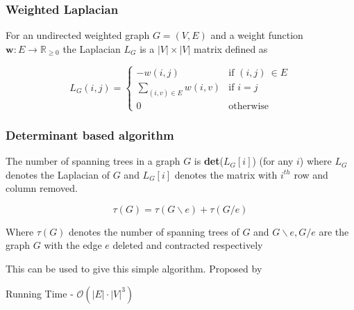 \documentclass{beamer}
\begin{document}
\begin{frame}
 \frametitle{Weighted Laplacian}
 
 For an undirected weighted graph $G = (V, E)$ and a weight function $\textbf{w}: E \rightarrow \mathbb{R}_{\geq 0}$ the Laplacian $L_G$ is a $|V| \times |V|$ matrix defined as 
 
  \[
    L_G(i, j) = 
\begin{cases}
    -w(i,j)& \text{if } (i, j) \ \in E\\
    \displaystyle\sum_{(i,v) \in E} w(i, v)& \text{if } i = j\\
    0              & \text{otherwise}
\end{cases}
\]

\end{frame}


\begin{frame}
 \frametitle{Determinant based algorithm}
 
\begin{theorem}
 
  The number of spanning trees in a graph $G$ is \textbf{det}($L_G[i]$) (for any $i$) where $L_G$ denotes the Laplacian of $G$ and $L_G[i]$ denotes the matrix with $i^{th}$ row and column removed. 
 
\end{theorem}

 
 \pause
 \begin{lemma}
  $$\tau(G) = \tau(G \backslash e) + \tau(G / e)$$
  
  Where $\tau(G)$ denotes the number of spanning trees of $G$ and $G \backslash e, G / e$ are the graph $G$ with the edge $e$ deleted and contracted respectively 
  
 \end{lemma}

 
 
\end{frame}

\begin{frame}
 This can be used to give this simple algorithm. Proposed by \cite{KULKARNI1990185}
 
\begin{figure}
\end{figure}
 
 \centering
 Running Time - $\mathcal{O}(|E| \cdot |V|^3)$
 
\end{frame}
\end{document}
